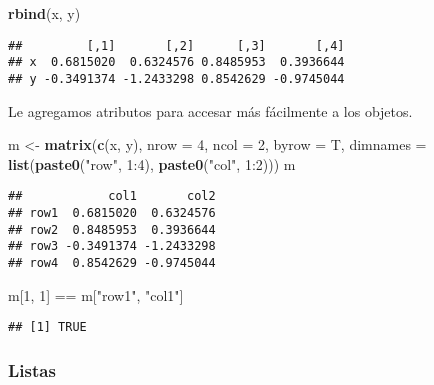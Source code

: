 \documentclass[]{article}
\newenvironment{Shaded}{\begin{snugshade}}{\end{snugshade}}
\newcommand{\KeywordTok}[1]{\textcolor[rgb]{0.13,0.29,0.53}{\textbf{{#1}}}}
\newcommand{\DataTypeTok}[1]{\textcolor[rgb]{0.13,0.29,0.53}{{#1}}}
\newcommand{\DecValTok}[1]{\textcolor[rgb]{0.00,0.00,0.81}{{#1}}}
\newcommand{\StringTok}[1]{\textcolor[rgb]{0.31,0.60,0.02}{{#1}}}
\newcommand{\NormalTok}[1]{{#1}}
\begin{document}
\begin{Shaded}
\begin{Highlighting}[]
\KeywordTok{rbind}\NormalTok{(x, y)}
\end{Highlighting}
\end{Shaded}

\begin{verbatim}
##         [,1]       [,2]      [,3]       [,4]
## x  0.6815020  0.6324576 0.8485953  0.3936644
## y -0.3491374 -1.2433298 0.8542629 -0.9745044
\end{verbatim}

Le agregamos atributos para accesar más fácilmente a los objetos.

\begin{Shaded}
\begin{Highlighting}[]
\NormalTok{m <-}\StringTok{ }\KeywordTok{matrix}\NormalTok{(}\KeywordTok{c}\NormalTok{(x, y), }\DataTypeTok{nrow =} \DecValTok{4}\NormalTok{, }\DataTypeTok{ncol =} \DecValTok{2}\NormalTok{, }\DataTypeTok{byrow =} \NormalTok{T,}
            \DataTypeTok{dimnames =} \KeywordTok{list}\NormalTok{(}\KeywordTok{paste0}\NormalTok{(}\StringTok{"row"}\NormalTok{, }\DecValTok{1}\NormalTok{:}\DecValTok{4}\NormalTok{),}
                            \KeywordTok{paste0}\NormalTok{(}\StringTok{"col"}\NormalTok{, }\DecValTok{1}\NormalTok{:}\DecValTok{2}\NormalTok{)))}
\NormalTok{m}
\end{Highlighting}
\end{Shaded}

\begin{verbatim}
##            col1       col2
## row1  0.6815020  0.6324576
## row2  0.8485953  0.3936644
## row3 -0.3491374 -1.2433298
## row4  0.8542629 -0.9745044
\end{verbatim}

\begin{Shaded}
\begin{Highlighting}[]
\NormalTok{m[}\DecValTok{1}\NormalTok{, }\DecValTok{1}\NormalTok{] ==}\StringTok{ }\NormalTok{m[}\StringTok{"row1"}\NormalTok{, }\StringTok{"col1"}\NormalTok{]}
\end{Highlighting}
\end{Shaded}

\begin{verbatim}
## [1] TRUE
\end{verbatim}

\subsubsection{Listas}\label{listas}
\end{document}
